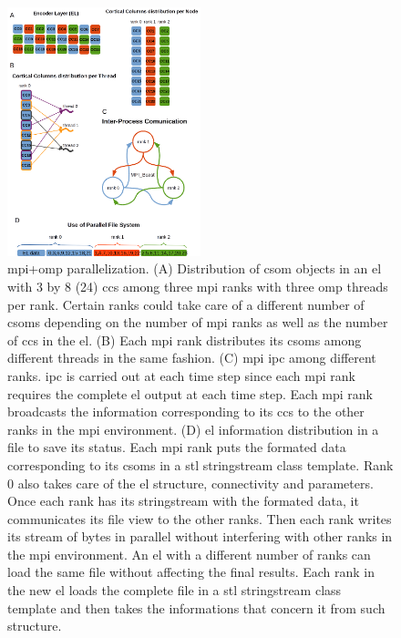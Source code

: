\documentclass[11pt,a4paper]{article}
\begin{document}
\begin{figure}[h!]
    \centering
    \includegraphics[width=0.5\textwidth]{EncoderParallelization.png}
    \caption{ \gls{mpi}+\gls{omp} parallelization. (A) Distribution of \gls{csom} objects in an \gls{el} with
    3 by 8 (24) \glspl{cc} among three \gls{mpi} ranks with three \gls{omp} threads per rank.
    Certain ranks could take care of a different number of
    \glspl{csom} depending on the number of \gls{mpi} ranks as well as the number of \glspl{cc} in the \gls{el}.
    (B) Each \gls{mpi} rank distributes its \glspl{csom} among different threads in the same fashion.
    (C) \gls{mpi} \gls{ipc} among different ranks. \gls{ipc} is carried out at each time step since each \gls{mpi} rank 
    requires the complete \gls{el} output at each time step.
    Each \gls{mpi} rank broadcasts the information corresponding to its \glspl{cc} to the other ranks in the \gls{mpi}
    environment.
    (D) \gls{el} information distribution in a file to save its status.
    Each \gls{mpi} rank puts the formated data corresponding to its \glspl{csom} in a \gls{stl} stringstream class template.
    Rank 0 also takes care of the \gls{el} structure, connectivity and parameters.
    Once each rank has its stringstream with the formated data, it communicates its file view to the other ranks.
    Then each rank writes its stream of bytes in parallel without interfering with other ranks in the \gls{mpi} environment.
    An \gls{el} with a different number of ranks can load the same file without affecting the final results.
    Each rank in the new \gls{el} loads the complete file in a \gls{stl} stringstream class template and then takes the
    informations that concern it from such structure.}
    \label{fig:EncoderParallelization}
\end{figure}
\end{document}
